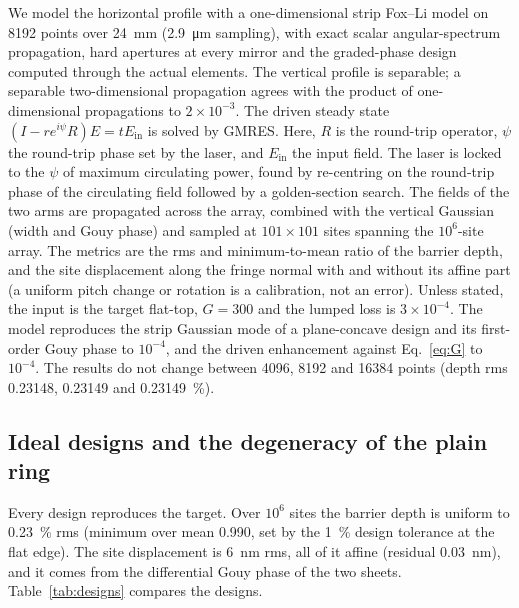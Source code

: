 \documentclass[11pt]{article}
\begin{document}
We model the horizontal profile with a one-dimensional strip Fox--Li model on 8192 points over
\SI{24}{\milli\metre} (\SI{2.9}{\micro\metre} sampling), with exact scalar angular-spectrum
propagation, hard apertures at every mirror and the graded-phase design computed through the actual
elements. The vertical profile is separable; a separable two-dimensional propagation agrees with the
product of one-dimensional propagations to $2\times10^{-3}$. The driven steady state
$(I - r e^{i\psi} R)E = t E_\mathrm{in}$ is solved by GMRES. Here, $R$ is the round-trip operator,
$\psi$ the round-trip phase set by the laser, and $E_\mathrm{in}$ the input field. The laser is locked
to the $\psi$ of maximum circulating power, found by re-centring on the round-trip phase of the
circulating field followed by a golden-section search. The fields of the two arms are propagated
across the array, combined with the vertical Gaussian (width and Gouy phase) and sampled at
$101 \times 101$ sites spanning the $10^{6}$-site array. The metrics are the rms and minimum-to-mean
ratio of the barrier depth, and the site displacement along the fringe normal with and without its
affine part (a uniform pitch change or rotation is a calibration, not an error). Unless stated, the
input is the target flat-top, $G = 300$ and the lumped loss is $3\times10^{-4}$. The model reproduces
the strip Gaussian mode of a plane-concave design and its first-order Gouy phase to $10^{-4}$, and the
driven enhancement against Eq.~\eqref{eq:G} to $10^{-4}$. The results do not change between 4096,
8192 and 16384 points (depth rms 0.23148, 0.23149 and \SI{0.23149}{\percent}).

\subsection{Ideal designs and the degeneracy of the plain ring}

Every design reproduces the target. Over $10^{6}$ sites the barrier depth is uniform to
\SI{0.23}{\percent} rms (minimum over mean 0.990, set by the \SI{1}{\percent} design tolerance at the
flat edge). The site displacement is \SI{6}{\nano\metre} rms, all of it affine (residual
\SI{0.03}{\nano\metre}), and it comes from the differential Gouy phase of the two sheets.
Table~\ref{tab:designs} compares the designs.
\end{document}
